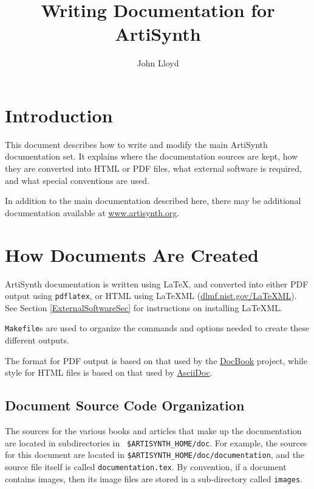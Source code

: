 \documentclass{article}
\title{Writing Documentation for ArtiSynth}
\author{John Lloyd}
\date{}
\begin{document}
\maketitle

\iflatexml{\large\today}\fi

\tableofcontents

\section{Introduction}

This document describes how to write and modify the main ArtiSynth
documentation set. It explains where the documentation sources are
kept, how they are converted into HTML or PDF files, what external
software is required, and what special conventions are used.

In addition to the main documentation described here, there may be
additional documentation available at
\href{http://www.artisynth.org}{www.artisynth.org}.

\section{How Documents Are Created}

ArtiSynth documentation is written using LaTeX, and converted into
either PDF output using {\tt pdflatex}, or HTML using LaTeXML
(\href{http://dlmf.nist.gov/LaTeXML/}{dlmf.nist.gov/LaTeXML}).  See
Section \ref{ExternalSoftwareSec} for instructions on installing LaTeXML.

{\tt Makefile}s are used to organize the commands and options needed
to create these different outputs.

The format for PDF output is based on that used by the
\href{http://www.docbook.org}{DocBook} project, while style for
HTML files is based on that used by
\href{http://www.methods.co.nz/asciidoc}{AsciiDoc}.

\subsection{Document Source Code Organization}

The sources for the various books and articles that make up the
documentation are located in subdirectories in {\tt
\$ARTISYNTH\_HOME/doc}.  For example, the sources for this document
are located in {\tt \$ARTISYNTH\_HOME/doc/documentation}, and the
source file itself is called {\tt documentation.tex}. 
By convention, if a
document contains images, then its image files are stored in a
sub-directory called {\tt images}.
\end{document}
